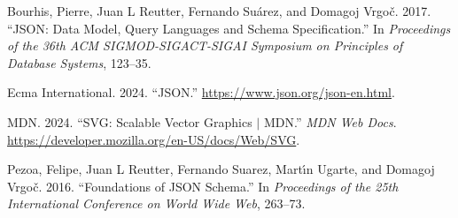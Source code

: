 \documentclass[
]{book}
\newlength{\cslhangindent}
\newlength{\cslentryspacingunit} %
\newenvironment{CSLReferences}[2] %
 {%
  \setlength{\parindent}{0pt}
  \ifodd #1
  \let\oldpar\par
  \def\par{\hangindent=\cslhangindent\oldpar}
  \fi
  \setlength{\parskip}{#2\cslentryspacingunit}
 }%
 {}
\begin{document}
\hypertarget{refs}{}
\begin{CSLReferences}{1}{0}
\leavevmode{}%
Bourhis, Pierre, Juan L Reutter, Fernando Suárez, and Domagoj Vrgoč. 2017. {``JSON: Data Model, Query Languages and Schema Specification.''} In \emph{Proceedings of the 36th ACM SIGMOD-SIGACT-SIGAI Symposium on Principles of Database Systems}, 123--35.

\leavevmode{}%
Ecma International. 2024. {``JSON.''} \url{https://www.json.org/json-en.html}.

\leavevmode{}%
MDN. 2024. {``SVG: Scalable Vector Graphics {\(\vert\)} MDN.''} \emph{MDN Web Docs}. \url{https://developer.mozilla.org/en-US/docs/Web/SVG}.

\leavevmode{}%
Pezoa, Felipe, Juan L Reutter, Fernando Suarez, Martı́n Ugarte, and Domagoj Vrgoč. 2016. {``Foundations of JSON Schema.''} In \emph{Proceedings of the 25th International Conference on World Wide Web}, 263--73.

\end{CSLReferences}
\end{document}
